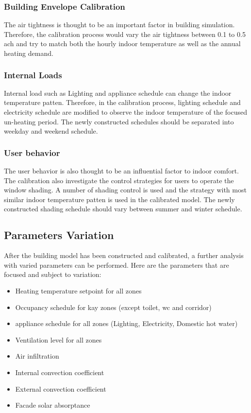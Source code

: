 \documentclass[11pt, a4paper]{article}
\theoremstyle{definition}
\begin{document}
		\subsubsection{Building Envelope Calibration}
			The air tightness is thought to be an important factor in building simulation. Therefore, the calibration process would vary the air tightness between 0.1 to 0.5 ach and try to match both the hourly indoor temperature as well as the annual heating demand.

		\subsubsection{Internal Loads}
			Internal load such as Lighting and appliance schedule can change the indoor temperature patten. Therefore, in the calibration process, lighting schedule and electricity schedule are modified to observe the indoor temperature of the focused un-heating period. The newly constructed schedules should be separated into weekday and weekend schedule.

		\subsubsection{User behavior}
			The user behavior is also thought to be an influential factor to indoor comfort. The calibration also investigate the control strategies for users to operate the window shading. A number of shading control is used and the strategy with most similar indoor temperature patten is used in the calibrated model. The newly constructed shading schedule should vary between summer and winter schedule.


	\subsection{Parameters Variation}
		After the building model has been constructed and calibrated, a further analysis with varied parameters can be performed. Here are the parameters that are focused and subject to variation:\\
		\begin{itemize}
			\item Heating temperature setpoint for all zones
			\item Occupancy schedule for kay zones (except toilet, wc and corridor)
			\item appliance schedule for all zones (Lighting, Electricity, Domestic hot water)
			\item Ventilation level for all zones
			\item Air infiltration
			\item Internal convection coefficient
			\item External convection coefficient
			\item Facade solar absorptance\\
		\end{itemize}
		
\end{document}
